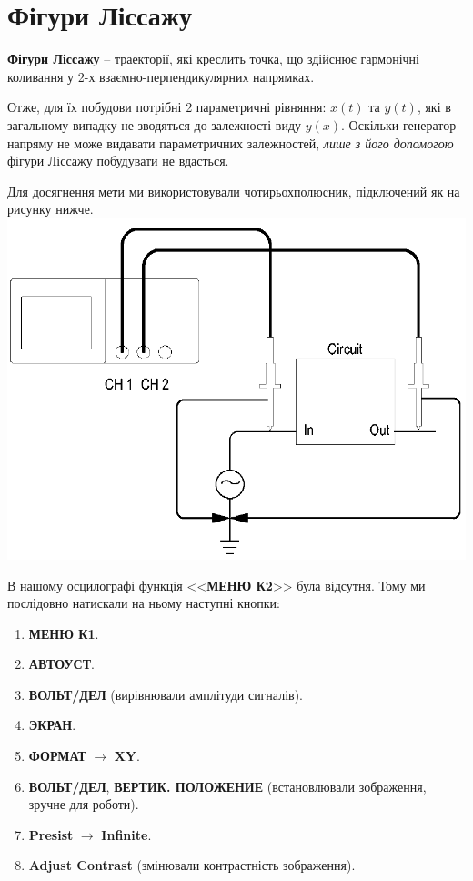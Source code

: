 \section{Фігури Ліссажу}
\textbf{Фігури Ліссажу} -- траекторії, які креслить точка, що здійснює 
гармонічні коливання у 2-х взаємно-перпендикулярних напрямках.

Отже, для їх побудови потрібні 2 параметричні рівняння: $x(t)$ та $y(t)$, які в загальному випадку не зводяться до залежності виду $y(x)$.
Оскільки генератор напряму не може видавати параметричних залежностей, \textit{лише з його допомогою} фігури Ліссажу побудувати не вдасться.

Для досягнення мети ми використовували чотирьохполюсник, підключений як на рисунку нижче. \\
\includegraphics[width=\textwidth, keepaspectratio]{1-lab/res/4pole.png}

В нашому осцилографі функція <<\textbf{МЕНЮ К2}>> була відсутня. Тому ми послідовно натискали на ньому наступні кнопки:
\begin{enumerate}
    \item \textbf{МЕНЮ К1}.
    \item \textbf{АВТОУСТ}.
    \item \textbf{ВОЛЬТ/ДЕЛ} (вирівнювали амплітуди сигналів).
    \item \textbf{ЭКРАН}.
    \item \textbf{ФОРМАТ} $\rightarrow$ \textbf{XY}. 
    \item \textbf{ВОЛЬТ/ДЕЛ}, \textbf{ВЕРТИК. ПОЛОЖЕНИЕ} (встановлювали зображення, зручне для роботи).
    \item \textbf{Presist} $\rightarrow$ \textbf{Infinite}.
    \item \textbf{Adjust Contrast} (змінювали контрастність зображення).
    
\end{enumerate}

